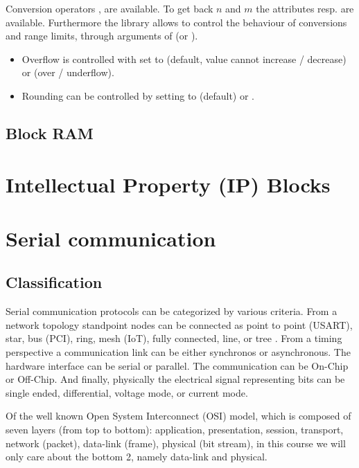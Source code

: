 \documentclass[margin=small]{tex/hsrzf}
\begin{document}
Conversion operators ,  are available. To get back \(n\) and \(m\) the attributes  resp.  are available. Furthermore the library allows to control the behaviour of conversions and range limits, through arguments of  (or ).
\begin{itemize}
  \item Overflow is controlled with  set to  (default, value cannot increase / decrease) or  (over / underflow).
  \item Rounding can be controlled by setting  to  (default) or .
\end{itemize}

\subsection{Block RAM}


\section{Intellectual Property (IP) Blocks}

\section{Serial communication}

\subsection{Classification}

Serial communication protocols can be categorized by various criteria. From a network topology standpoint nodes can be connected as point to point (USART), star, bus (PCI), ring, mesh (IoT), fully connected, line, or tree . From a timing perspective a communication link can be either synchronos or asynchronous. The hardware interface can be serial or parallel. The communication can be On-Chip or Off-Chip. And finally, physically the electrical signal representing bits can be single ended, differential, voltage mode, or current mode.

Of the well known Open System Interconnect (OSI) model, which is composed of seven layers (from top to bottom): application, presentation, session, transport, network (packet), data-link (frame), physical (bit stream), in this course we will only care about the bottom 2, namely data-link and physical.
\end{document}
